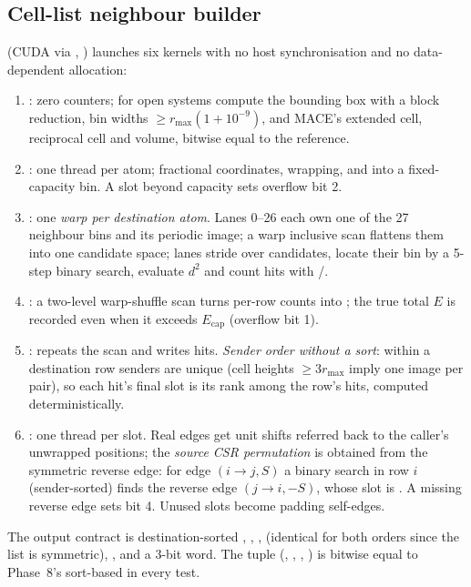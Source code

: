 \subsection{Cell-list neighbour builder}
 (CUDA via , ) launches six kernels with no host synchronisation and no data-dependent allocation:
\begin{enumerate}
  \item {}: zero counters; for open systems compute the bounding box with a block reduction, bin widths $\ge r_{\max}(1+10^{-9})$, and MACE's extended cell, reciprocal cell and volume, bitwise equal to the reference.
  \item {}: one thread per atom; fractional coordinates, wrapping, and  into a fixed-capacity bin. A slot beyond capacity sets overflow bit 2.
  \item {}: one \emph{warp per destination atom}. Lanes 0--26 each own one of the 27 neighbour bins and its periodic image; a warp inclusive scan flattens them into one candidate space; lanes stride over candidates, locate their bin by a 5-step binary search, evaluate $d^2$ and count hits with /.
  \item {}: a two-level warp-shuffle scan turns per-row counts into ; the true total $E$ is recorded even when it exceeds $E_{\text{cap}}$ (overflow bit 1).
  \item {}: repeats the scan and writes hits. \emph{Sender order without a sort}: within a destination row senders are unique (cell heights $\ge3r_{\max}$ imply one image per pair), so each hit's final slot is its rank among the row's hits, computed deterministically.
  \item {}: one thread per slot. Real edges get unit shifts referred back to the caller's unwrapped positions; the \emph{source CSR permutation} is obtained from the symmetric reverse edge: for edge $(i\to j,S)$ a binary search in row $i$ (sender-sorted) finds the reverse edge $(j\to i,-S)$, whose slot is . A missing reverse edge sets bit 4. Unused slots become padding self-edges.
\end{enumerate}
The output contract is destination-sorted , , ,  (identical for both orders since the list is symmetric), ,  and a 3-bit  word. The tuple (, , , ) is bitwise equal to Phase~8's sort-based  in every test.

